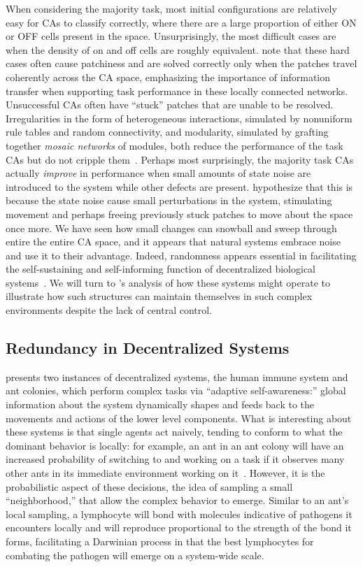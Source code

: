 \documentclass[a4paper,11pt,twoside]{report}
\begin{document}
When considering the majority task, most initial configurations are relatively easy for CAs to classify correctly, where there are a large proportion of either ON or OFF cells present in the space. Unsurprisingly, the most difficult cases are when the density of on and off cells are roughly equivalent. \citeauthor{me07} note that these hard cases often cause patchiness and are solved correctly only when the patches travel coherently across the CA space, emphasizing the importance of information transfer when supporting task performance in these locally connected networks. Unsuccessful CAs often have ``stuck'' patches that are unable to be resolved. Irregularities in the form of heterogeneous interactions, simulated by nonuniform rule tables and random connectivity, and modularity, simulated by grafting together \textit{mosaic networks} of modules, both reduce the performance of the task CAs but do not cripple them~\cite{me07}. Perhaps most surprisingly, the majority task CAs actually \textit{improve} in performance when small amounts of state noise are introduced to the system while other defects are present. \citeauthor{me07} hypothesize that this is because the state noise cause small perturbations in the system, stimulating movement and perhaps freeing previously stuck patches to move about the space once more. We have seen how small changes can snowball and sweep through entire the entire CA space, and it appears that natural systems embrace noise and use it to their advantage. Indeed, randomness appears essential in facilitating the self-sustaining and self-informing function of decentralized biological systems~\cite{mi05}. We will turn to \citeauthor{mi05}'s analysis of how these systems might operate to illustrate how such structures can maintain themselves in such complex environments despite the lack of central control.


\subsection{Redundancy in Decentralized Systems}
\citeauthor{mi05} presents two instances of decentralized systems, the human immune system and ant colonies, which perform complex tasks via ``adaptive self-awareness:'' global information about the system dynamically shapes and feeds back to the movements and actions of the lower level components. What is interesting about these systems is that single agents act naively, tending to conform to what the dominant behavior is locally: for example, an ant in an ant colony will have an increased probability of switching to and working on a task if it observes many other ants in its immediate environment working on it~\cite{mi05}. However, it is the probabilistic aspect of these decisions, the idea of sampling a small ``neighborhood,'' that allow the complex behavior to emerge. Similar to an ant's local sampling, a lymphocyte will bond with molecules indicative of pathogens it encounters locally and will reproduce proportional to the strength of the bond it forms, facilitating a Darwinian process in that the best lymphocytes for combating the pathogen will emerge on a system-wide scale.
\end{document}
